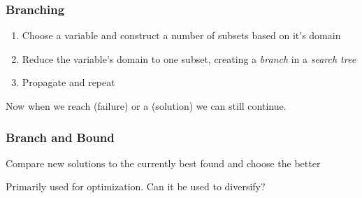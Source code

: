 \begin{frame}
	\frametitle{Branching}

	\begin{enumerate}
		\item Choose a variable and construct a number of subsets based on it's domain
		\item Reduce the variable's domain to one subset, creating a \textit{branch} in a \textit{search tree}
		\item Propagate and repeat
	\end{enumerate}

	\vspace{0.5cm}

	Now when we reach (failure) or a (solution) we can still continue.

\end{frame}

\begin{frame}
	\frametitle{Branch and Bound}

	Compare new solutions to the currently best found and choose the better \cite{BaB}

	\vspace{0.5cm}

	Primarily used for optimization. Can it be used to diversify?

\end{frame}
